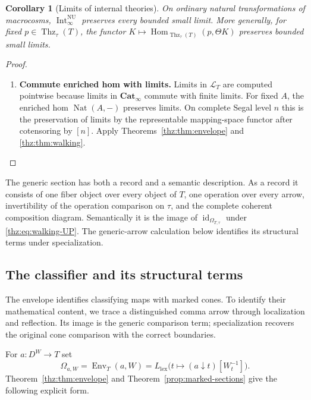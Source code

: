 \documentclass[oneside]{article}
\theoremstyle{plain}
\newtheorem{corollary}[theorem]{Corollary}
\theoremstyle{definition}
\theoremstyle{remark}
\newcommand{\Cat}{\mathbf{Cat}_{\infty}}
\newcommand{\Env}{\operatorname{Env}}
\newcommand{\Int}{\operatorname{Int}}
\newcommand{\NU}{\mathrm{NU}}
\newcommand{\Nat}{\operatorname{Nat}}
\newcommand{\Thz}{\operatorname{Thz}}
\newcommand{\id}{\operatorname{id}}
\begin{document}
\begin{corollary}[Limits of internal theories]\label{thz:cor:limits}
On ordinary natural transformations of macrocosms,
$\Int^{\NU}_\infty$ preserves every bounded small limit.  More
generally, for fixed $p\in\Thz_\tau(T)$, the functor $K\longmapsto \operatorname{Hom}_{\Thz_\tau(T)}(p,\Theta K)$ preserves bounded small limits.
\end{corollary}
\begin{proof}
\leavevmode
\begin{enumerate}
\item \textbf{Commute enriched hom with limits.} Limits in $\mathcal L_T$ are computed pointwise because limits in
$\Cat$ commute with finite limits.  For fixed $A$, the enriched hom
$\Nat(A,-)$ preserves limits.  On complete Segal level $n$ this is the
preservation of limits by the representable mapping-space functor
after cotensoring by $[n]$.  Apply
Theorems~\ref{thz:thm:envelope} and \ref{thz:thm:walking}.\qedhere
\end{enumerate}
\end{proof}

The generic section has both a record and a semantic description.  As a
record it consists of one fiber object over every object of $T$, one
operation over every arrow, invertibility of the operation comparison on
$\tau$, and the complete coherent composition diagram.  Semantically it
is the image of $\id_{\Omega_{T,\tau}}$ under
\eqref{thz:eq:walking-UP}.  The generic-arrow calculation below identifies its structural terms under specialization.

\subsection{The classifier and its structural terms}

The envelope identifies classifying maps with marked cones. To identify
their mathematical content, we trace a distinguished comma arrow through
localization and reflection. Its image is the generic comparison term;
specialization recovers the original cone comparison with the correct
boundaries.

For $a:D^W\to T$ set
\begin{equation}\label{eq:envelope}
 \Omega_{a,W}=\Env_T(a,W)
 =L_{\mathrm{lex}}\bigl(t\mapsto(a\downarrow t)[W_t^{-1}]\bigr).
\end{equation}
Theorem~\ref{thz:thm:envelope} and
Theorem~\ref{prop:marked-sections} give the following explicit form.
\end{document}
